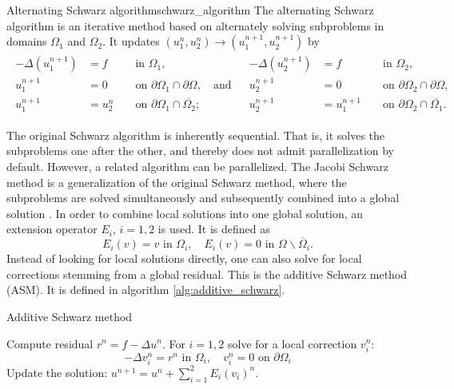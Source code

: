 \begin{fancydef}{Alternating Schwarz algorithm}{schwarz_algorithm}
  The alternating Schwarz algorithm is an iterative method based on alternately solving subproblems in domains $\Omega_1$ and $\Omega_2$. It updates $\left(u_1^n, u_2^n\right) \rightarrow\left(u_1^{n+1}, u_2^{n+1}\right)$ by
  \[
    \begin{array}{cc}
      \begin{aligned}
        -\Delta\left(u_1^{n+1}\right) & =f     &  & \text { in } \Omega_1,                                                 \\
        u_1^{n+1}                     & =0     &  & \text { on } \partial \Omega_1 \cap \partial \Omega, \quad \text{and} \\
        u_1^{n+1}                     & =u_2^n &  & \text { on } \partial \Omega_1 \cap \overline{\Omega_2} ;
      \end{aligned} &
      \begin{aligned}
        -\Delta\left(u_2^{n+1}\right) & =f         &  & \text { in } \Omega_2,                                   \\
        u_2^{n+1}                     & =0         &  & \text { on } \partial \Omega_2 \cap \partial \Omega,     \\
        u_2^{n+1}                     & =u_1^{n+1} &  & \text { on } \partial \Omega_2 \cap \overline{\Omega_1}.
      \end{aligned}
    \end{array}
  \]
\end{fancydef}

The original Schwarz algorithm is inherently sequential. That is, it solves the subproblems one after the other, and thereby does not admit parallelization by default. However, a related algorithm can be parallelized. The Jacobi Schwarz method is a generalization of the original Schwarz method, where the subproblems are solved simultaneously and subsequently combined into a global solution \cite{og_alternating_schwarz_Lions1990}. In order to combine local solutions into one global solution, an extension operator $E_i$, $i=1,2$ is used. It is defined as
\[
  E_i(v)=v \text { in } \Omega_i, \quad E_i(v)=0 \text { in } \Omega \backslash \overline{\Omega}_i.
\]
Instead of looking for local solutions directly, one can also solve for local corrections stemming from a global residual. This is the additive Schwarz method (ASM). It is defined in algorithm \ref{alg:additive_schwarz}.
\begin{algorithm}[H]
  \caption{Additive Schwarz method \cite[Algorithm 1.2]{schwarz_methods_Dolean_2015}}
  \label{alg:additive_schwarz}
  \begin{algorithmic}
    \State Compute residual $r^n=f-\Delta u^n$.
    \State For $i=1,2$ solve for a local correction $v_i^n$:
    \[
      -\Delta v_i^n=r^n \text{ in } \Omega_i, \quad v_i^n=0 \text{ on } \partial \Omega_i
    \]
    \State Update the solution: $u^{n+1}=u^n+\sum_{i=1}^{2}E_i(v_i)^n$.
  \end{algorithmic}
\end{algorithm}

